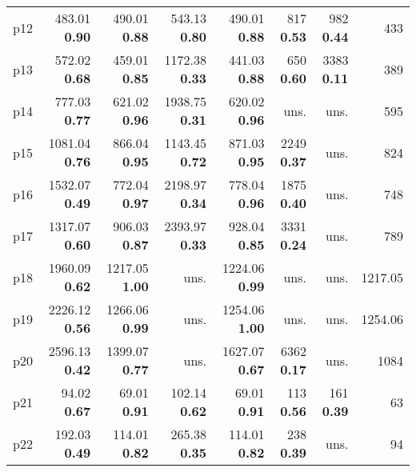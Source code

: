 \begin{tabular}{|l|rrrrrr|r|}
p12 & {\footnotesize 483.01} \textbf{0.90} & {\footnotesize 490.01} \textbf{0.88} & {\footnotesize 543.13} \textbf{0.80} & {\footnotesize 490.01} \textbf{0.88} & {\footnotesize 817} \textbf{0.53} & {\footnotesize 982} \textbf{0.44} & 433\\
p13 & {\footnotesize 572.02} \textbf{0.68} & {\footnotesize 459.01} \textbf{0.85} & {\footnotesize 1172.38} \textbf{0.33} & {\footnotesize 441.03} \textbf{0.88} & {\footnotesize 650} \textbf{0.60} & {\footnotesize 3383} \textbf{0.11} & 389\\
p14 & {\footnotesize 777.03} \textbf{0.77} & {\footnotesize 621.02} \textbf{0.96} & {\footnotesize 1938.75} \textbf{0.31} & {\footnotesize 620.02} \textbf{0.96} & uns. & uns. & 595\\
p15 & {\footnotesize 1081.04} \textbf{0.76} & {\footnotesize 866.04} \textbf{0.95} & {\footnotesize 1143.45} \textbf{0.72} & {\footnotesize 871.03} \textbf{0.95} & {\footnotesize 2249} \textbf{0.37} & uns. & 824\\
p16 & {\footnotesize 1532.07} \textbf{0.49} & {\footnotesize 772.04} \textbf{0.97} & {\footnotesize 2198.97} \textbf{0.34} & {\footnotesize 778.04} \textbf{0.96} & {\footnotesize 1875} \textbf{0.40} & uns. & 748\\
p17 & {\footnotesize 1317.07} \textbf{0.60} & {\footnotesize 906.03} \textbf{0.87} & {\footnotesize 2393.97} \textbf{0.33} & {\footnotesize 928.04} \textbf{0.85} & {\footnotesize 3331} \textbf{0.24} & uns. & 789\\
p18 & {\footnotesize 1960.09} \textbf{0.62} & {\footnotesize 1217.05} \textbf{1.00} & uns. & {\footnotesize 1224.06} \textbf{0.99} & uns. & uns. & 1217.05\\
p19 & {\footnotesize 2226.12} \textbf{0.56} & {\footnotesize 1266.06} \textbf{0.99} & uns. & {\footnotesize 1254.06} \textbf{1.00} & uns. & uns. & 1254.06\\
p20 & {\footnotesize 2596.13} \textbf{0.42} & {\footnotesize 1399.07} \textbf{0.77} & uns. & {\footnotesize 1627.07} \textbf{0.67} & {\footnotesize 6362} \textbf{0.17} & uns. & 1084\\
p21 & {\footnotesize 94.02} \textbf{0.67} & {\footnotesize 69.01} \textbf{0.91} & {\footnotesize 102.14} \textbf{0.62} & {\footnotesize 69.01} \textbf{0.91} & {\footnotesize 113} \textbf{0.56} & {\footnotesize 161} \textbf{0.39} & 63\\
p22 & {\footnotesize 192.03} \textbf{0.49} & {\footnotesize 114.01} \textbf{0.82} & {\footnotesize 265.38} \textbf{0.35} & {\footnotesize 114.01} \textbf{0.82} & {\footnotesize 238} \textbf{0.39} & uns. & 94\\

\end{tabular}

